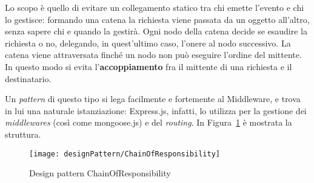 Lo scopo è quello di evitare un collegamento statico tra chi emette l'evento e chi lo gestisce: formando una catena la richiesta viene passata da un oggetto all'altro, senza sapere chi e quando la gestirà. Ogni nodo della catena decide se esaudire la richiesta o no, delegando, in quest'ultimo caso, l'onere al nodo successivo. La catena viene attraversata finché un nodo non può eseguire l'ordine del mittente. In questo modo si evita l’\textbf{accoppiamento} fra il mittente di una richiesta e il destinatario.

Un \textit{pattern} di questo tipo si lega facilmente e fortemente al Middleware, e trova in lui una naturale istanziazione: Express.js, infatti, lo utilizza per la gestione dei \textit{middlewares} (così come mongoose.js) e del \textit{routing}. In Figura~\ref{fig:cor} è mostrata la struttura.

\begin{figure}[h]
  \begin{center}
    \texttt{[image: designPattern/ChainOfResponsibility]}
  \caption[Design pattern ChainOfResponsibility]{Design pattern ChainOfResponsibility}
  \label{fig:cor}
  \end{center} 
\end{figure}

